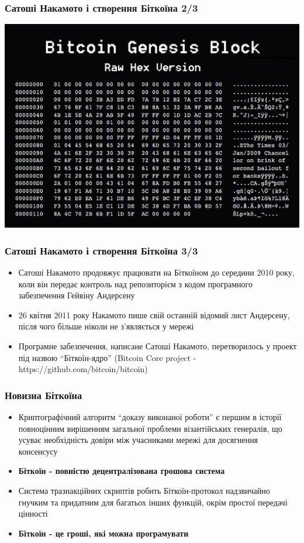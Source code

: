 \documentclass{beamer}
\begin{document}
\begin{frame}[fragile]
  \frametitle{Сатоші Накамото і створення Біткоїна 2/3}
  \includegraphics[width=\textwidth]{genesis-block}
\end{frame}

\begin{frame}
  \frametitle{Сатоші Накамото і створення Біткоїна 3/3}
  \begin{itemize}
  \item Сатоші Накамото продовжує працювати на Біткоїном до середини 2010 року,
    коли він передає контроль над репозиторієм з кодом програмного забезпечення
    Гейвіну Андерсену
  \item 26 квітня 2011 року Накамото пише свій останній відомий лист Андерсену,
    після чого більше ніколи не з'являється у мережі
  \item Програмне забезпечення, написане Сатоші Накамото, перетворилось у проект
    під назвою ``Біткоїн-ядро'' (Bitcoin Core project - https://github.com/bitcoin/bitcoin)
  \end{itemize}
\end{frame}

\begin{frame}
  \frametitle{Новизна Біткоїна}
  \begin{itemize}
  \item Криптографічний алгоритм ``доказу виконаної роботи'' є першим в історії
    повноцінним вирішенням загальної проблеми візантійських генералів, що усуває
    необхідність довіри між учасниками мережі для досягнення консенсусу
  \item \textbf{Біткоїн - повністю децентралізована грошова система}
  \item Система тразнакційних скриптів робить Біткоїн-протокол надзвичайно
    гнучким та придатним для багатьох інших функцій, окрім простої передачі
    цінності
  \item \textbf{Біткоїн - це гроші, які можна програмувати}
  \end{itemize}
\end{frame}
\end{document}
